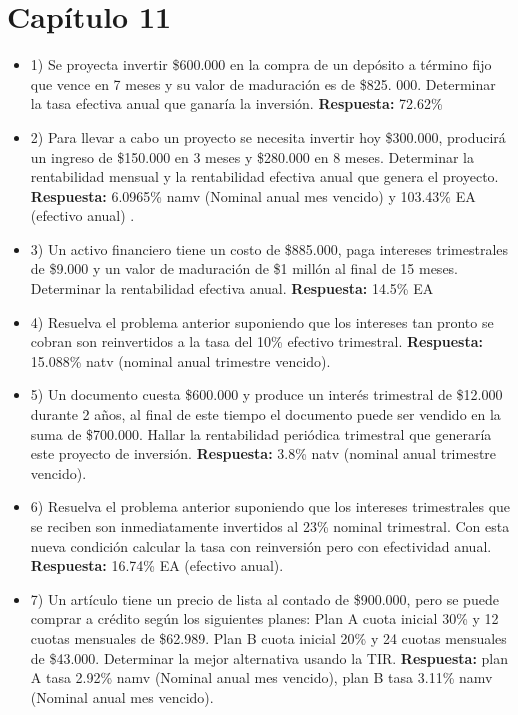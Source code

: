 \chapter*{Capítulo 11}
\begin{itemize}

	\item 1) Se proyecta invertir \$600.000 en la compra de un depósito a término fijo que vence en 7 meses y su valor de maduración es de 
    \$825. 000. Determinar la tasa efectiva anual que ganaría la inversión.
	      \textbf{ Respuesta:} 72.62\%
	      
	\item 2) Para llevar a cabo un proyecto se necesita invertir hoy 
    \$300.000, producirá un ingreso de \$150.000 en 3 meses y \$280.000 en 8 meses. Determinar la rentabilidad mensual y la rentabilidad efectiva anual que genera el proyecto.
	      \textbf{ Respuesta:} 6.0965\% namv (Nominal anual mes vencido) y 103.43\% EA (efectivo anual) .
	      
	\item 3) Un activo financiero tiene un costo de \$885.000, paga intereses trimestrales de \$9.000 y un valor de maduración de \$1 millón al final de 15 meses. Determinar la rentabilidad efectiva anual.
	      \textbf{ Respuesta:} 14.5\% EA
	      
	\item 4) Resuelva el problema anterior suponiendo que los intereses tan pronto se cobran son reinvertidos a la tasa del 10\% efectivo trimestral.
	      \textbf{ Respuesta:} 15.088\% natv (nominal anual trimestre vencido).
	      
	\item 5) Un documento cuesta \$600.000 y produce un interés trimestral de \$12.000 durante 2 años, al final de este tiempo el documento puede ser vendido en la suma de \$700.000. Hallar la rentabilidad periódica trimestral que generaría este proyecto de inversión.
	      \textbf{ Respuesta:} 3.8\% natv (nominal anual trimestre vencido).
	      
	\item 6) Resuelva el problema anterior suponiendo que los intereses trimestrales que se reciben son inmediatamente invertidos al 23\% nominal trimestral. Con esta nueva condición calcular la tasa con reinversión pero con efectividad anual.
	      \textbf{ Respuesta:} 16.74\% EA (efectivo anual).
	      
	\item 7) Un artículo tiene un precio de lista al contado de \$900.000, pero se puede comprar a crédito según los siguientes planes: Plan A cuota inicial 30\% y 12 cuotas mensuales de \$62.989. Plan B cuota inicial 20\% y 24 cuotas mensuales de \$43.000. Determinar la mejor alternativa usando la TIR.
	      \textbf{ Respuesta:} plan A tasa 2.92\% namv (Nominal anual mes vencido), plan B tasa 3.11\% namv (Nominal anual mes vencido).
	      

\end{itemize}
